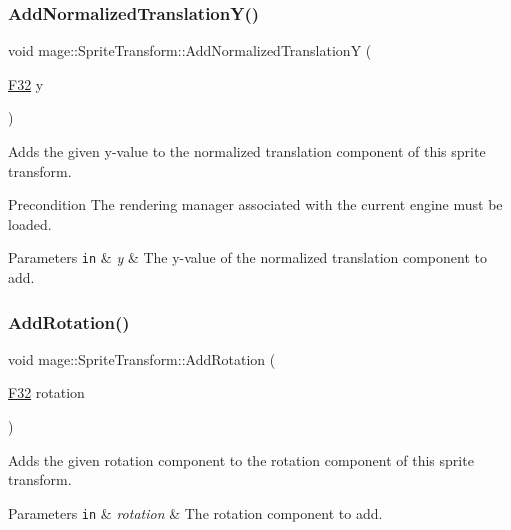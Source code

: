 \subsubsection{\texorpdfstring{Add\+Normalized\+Translation\+Y()}{AddNormalizedTranslationY()}}
{\footnotesize\ttfamily void mage\+::\+Sprite\+Transform\+::\+Add\+Normalized\+TranslationY (\begin{DoxyParamCaption}\item[{\hyperlink{namespacemage_aa97e833b45f06d60a0a9c4fc22ae02c0}{F32}}]{y }\end{DoxyParamCaption})}

Adds the given y-\/value to the normalized translation component of this sprite transform.

\begin{DoxyPrecond}{Precondition}
The rendering manager associated with the current engine must be loaded. 
\end{DoxyPrecond}

\begin{DoxyParams}[1]{Parameters}
\mbox{\tt in}  & {\em y} & The y-\/value of the normalized translation component to add. \\
\hline
\end{DoxyParams}
\hypertarget{structmage_1_1_sprite_transform_ab189a29372631e74ae5f638243eaa312}{}\label{structmage_1_1_sprite_transform_ab189a29372631e74ae5f638243eaa312} 
\subsubsection{\texorpdfstring{Add\+Rotation()}{AddRotation()}}
{\footnotesize\ttfamily void mage\+::\+Sprite\+Transform\+::\+Add\+Rotation (\begin{DoxyParamCaption}\item[{\hyperlink{namespacemage_aa97e833b45f06d60a0a9c4fc22ae02c0}{F32}}]{rotation }\end{DoxyParamCaption})\hspace{0.3cm}{\ttfamily [noexcept]}}

Adds the given rotation component to the rotation component of this sprite transform.


\begin{DoxyParams}[1]{Parameters}
\mbox{\tt in}  & {\em rotation} & The rotation component to add. \\
\hline
\end{DoxyParams}
\hypertarget{structmage_1_1_sprite_transform_adc0912e49d43143f7fe5c8fc1c25dacf}{}\label{structmage_1_1_sprite_transform_adc0912e49d43143f7fe5c8fc1c25dacf} 
